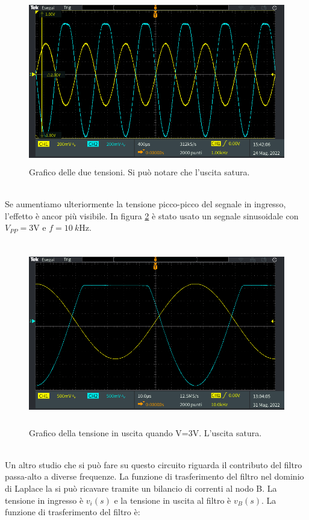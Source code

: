 \documentclass{report}
\begin{document}
\begin{figure}[h]
\centering
\includegraphics[height=7.2cm]{immagini/oscillo8}
\caption{Grafico delle due tensioni. Si può notare che l'uscita satura.}
\label{figura:oscillo8}
\end{figure}
\\Se aumentiamo ulteriormente la tensione picco-picco del segnale in ingresso, l'effetto è ancor più visibile. In figura \ref{figura:oscillo9} è stato usato un segnale sinusoidale con $V_{PP}=3$V e $f=\SI{10}{k\hertz}$.
\begin{figure}[h]
\centering
\includegraphics[height=8cm]{immagini/oscillo9}
\caption{Grafico della tensione in uscita quando V=3V. L'uscita satura.}
\label{figura:oscillo9}
\end{figure}
\\Un altro studio che si può fare su questo circuito riguarda il contributo del filtro passa-alto a diverse frequenze. La funzione di trasferimento del filtro nel dominio di Laplace la si può ricavare tramite un bilancio di correnti al nodo B. La tensione in ingresso è $v_i\left(s\right)$ e la tensione in uscita al filtro è $v_B\left(s\right)$. La funzione di trasferimento del filtro è:
\end{document}
